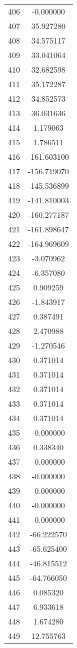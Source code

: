 \documentclass[12pt]{article}
\begin{document}
\begin{longtable}{@{}cc@{}}
406 & -0.000000 \\
407 & 35.927280 \\
408 & 34.575117 \\
409 & 33.041064 \\
410 & 32.682598 \\
411 & 35.172287 \\
412 & 34.852573 \\
413 & 36.031636 \\
414 & 1.179063 \\
415 & 1.786511 \\
416 & -161.603100 \\
417 & -156.719070 \\
418 & -145.536899 \\
419 & -141.810003 \\
420 & -160.277187 \\
421 & -161.898647 \\
422 & -164.969609 \\
423 & -3.070962 \\
424 & -6.357080 \\
425 & 0.909259 \\
426 & -1.843917 \\
427 & 0.387491 \\
428 & 2.470988 \\
429 & -1.270546 \\
430 & 0.371014 \\
431 & 0.371014 \\
432 & 0.371014 \\
433 & 0.371014 \\
434 & 0.371014 \\
435 & -0.000000 \\
436 & 0.338340 \\
437 & -0.000000 \\
438 & -0.000000 \\
439 & -0.000000 \\
440 & -0.000000 \\
441 & -0.000000 \\
442 & -66.222570 \\
443 & -65.625400 \\
444 & -46.815512 \\
445 & -64.766050 \\
446 & 0.085320 \\
447 & 6.933618 \\
448 & 1.674280 \\
449 & 12.755763 \\

\end{longtable}
\end{document}
